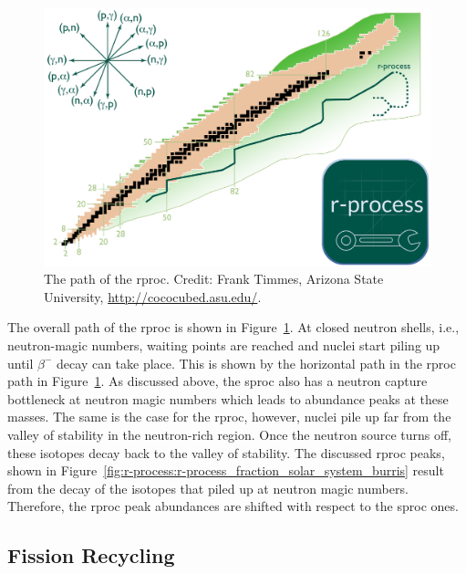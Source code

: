 \begin{figure}[tb]
    \centering
    \includegraphics[width=\textwidth]{graphics/r-process/rproc_path}
    \caption{The path of the \ac{rproc}. Credit: Frank Timmes, Arizona State University, \url{http://cococubed.asu.edu/}.}
    \label{fig:r-process:rproc_path_timmes}
\end{figure}
The overall path of the \ac{rproc} is shown in Figure~\ref{fig:r-process:rproc_path_timmes}. At closed neutron shells, i.e., neutron-magic numbers, waiting points are reached and nuclei start piling up until $\beta^{-}$ decay can take place. This is shown by the horizontal path in the \ac{rproc} path in Figure~\ref{fig:r-process:rproc_path_timmes}. As discussed above, the \ac{sproc} also has a neutron capture bottleneck at neutron magic numbers which leads to abundance peaks at these masses. The same is the case for the \ac{rproc}, however, nuclei pile up far from the valley of stability in the neutron-rich region. Once the neutron source turns off, these isotopes decay back to the valley of stability. The discussed \ac{rproc} peaks, shown in Figure~\ref{fig:r-process:r-process_fraction_solar_system_burris} result from the decay of the isotopes that piled up at neutron magic numbers. Therefore, the \ac{rproc} peak abundances are shifted with respect to the \ac{sproc} ones.

\subsection{Fission Recycling}


